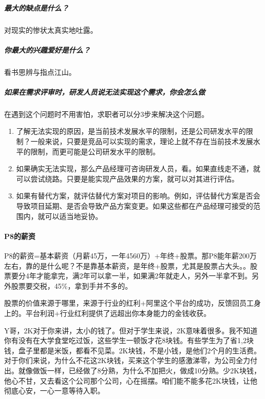 \documentclass[letterpaper,11pt,english]{sphinxmanual}
\begin{document}
\subparagraph{最大的缺点是什么？}
\label{\detokenize{chapter_interview/HR:id5}}
对现实的惨状太真实地吐露。


\subparagraph{你最大的兴趣爱好是什么？}
\label{\detokenize{chapter_interview/HR:id6}}
看书思辨与指点江山。


\subparagraph{如果在需求评审时，研发人员说无法实现这个需求，你会怎么做}
\label{\detokenize{chapter_interview/HR:id7}}
在遇到这个问题时不用害怕，求职者可以分3步来解决这个问题。
\begin{enumerate}
%
\item {} 
了解无法实现的原因，是当前技术发展水平的限制，还是公司研发水平的限制？一般来说，只要是竞品可以实现的需求，理论上就不存在当前技术发展水平的限制，而更可能是公司研发水平的限制。

\item {} 
如果确实无法实现，那么产品经理可咨询研发人员，看。如果直线走不通，就可以尝试绕路。只要是能实现产品效果的方案，就可以对其进行评估。

\item {} 
如果有替代方案，就评估替代方案对项目的影响。例如，评估替代方案是否会导致项目延期、是否会导致产品方案变更。如果这些都在产品经理可接受的范围内，就可以适当地妥协。

\end{enumerate}


\paragraph{P8的薪资}
\label{\detokenize{chapter_interview/HR:p8}}
P8的薪资=基本薪资（月薪4\sphinxhyphen{}5万，一年45\sphinxhyphen{}60万）+年终+股票。那P8能年薪200万左右，靠的是什么呢？不是靠基本薪资，是年终+股票，尤其是股票占大头。。股票要分4年才能拿完，满2年可以拿一半，如果满2年就走人，另外一半拿不到。另外股票要交税，45\%，拿到手并不多的。

股票的价值来源于哪里，来源于行业的红利+阿里这个平台的成功，反馈回员工身上的。平台利润+行业红利提供了远超出你本身能力的金钱收获。

Y哥，2K对于你来讲，太小的钱了。但对于学生来说，2K意味着很多。我不知道你有没有在大学食堂吃过饭，这些学生一顿饭才花8块钱。有些学生为了省1,2块钱，盘子里都是米饭，都看不见菜。2K块钱，不是小钱，是他们2个月的生活费。对于你们来说，为什么不花这2K块钱，买来这个学生的感激涕零，为公司全力付出。就像做饭一样，已经做了8分熟，为什么不加把火，做成10分熟。少2K块钱，他心不甘，又去看这个公司那个公司，心在摇摆。咱们能不能多花2K块钱，让他彻底心安，一心一意等待入职。%
\begin{footnote}[291]\sphinxAtStartFootnote
{}
%
\end{footnote}
\end{document}
